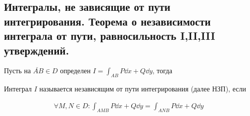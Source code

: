 \subsection{%
  Интегралы, не зависящие от пути интегрирования. Теорема о независимости
  интеграла от пути, равносильность I,II,III утверждений.%
}

Пусть на \(\breve{AB} \in D\) определен \(I = \int_{AB} P \dd x + Q \dd y\),
тогда

\begin{definition}
  Интеграл \(I\) называется независящим от пути интегрирования (далее НЗП), если

  \begin{align*}
    \forall M, N \in D \colon
    \int_{AMB} P\dd x + Q \dd y = \int_{ANB} P\dd x + Q \dd y 
  \end{align*}
\end{definition}

